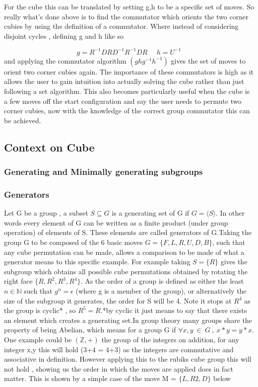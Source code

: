 \documentclass{article}
\begin{document}
For the cube this can be translated by setting g,h to be a specific set of moves. So really what's done above is to find the commutator which orients the two corner cubies by using the definition of a commutator. Where instead of considering disjoint cycles , defining g and h like so

\begin{equation}
	g = R^{-1}DRD^{-1}R^{-1}DR\ \ \ \ \ \ 
    h = U^{-1}
\end{equation}
and applying the commutator algorithm $(ghg^{-1}h^{-1})$ gives the set of moves to orient two corner cubies again. The importance of these commutators is high as it allows the user to gain intuition into actually solving the cube rather than just following a set algorithm. This also becomes particularly useful when the cube is a few moves off the start configuration and say the user needs to permute two corner cubies, now with the knowledge of the correct group commutator this can be achieved.



\subsection*{Context on Cube}
\subsubsection*{Generating and Minimally generating subgroups}


\subsubsection*{Generators}
Let G be a group , a subset $S\subseteq G$ is a generating set of G if $G =\langle S\rangle $. In other words every element of G can be written as a finite product (under group operation)  of elements of S. These elements are called generators of G.Taking the group G to be composed of the 6 basic moves  $G= \{{F,L,R,U,D,B}\}$, such that  any cube permutation can be made, allows  a comparison to be made of what a generator means to this specific example.  For example taking $S=\{R\}$ gives the subgroup which obtains all possible cube permutations obtained by rotating the right face $\{R,R^2,R^3,R^4\}$. As the order of a group is defined as either the least $n \in \mathbb{N}$ such that $g^n = \epsilon$ (where g is a member of the group),  or alternatively the size of the subgroup it generates, the order for S will be 4. Note it stops at $R^4$ as the group is cyclic* , so $R^5= R$.*by cyclic it just means to say that there exists an element which creates a generating set.\newline In group theory many groups share the property of being Abelian, which means for a group G if $\forall x,y\ \in\ G\ ,\ x*y=y*x$. One example could be $(\mathbb{Z},+)$ the group of the integers on addition, for any integer x,y this will hold (3+4 = 4+3) as the integers are commutative and associative in definition.
However applying this to the rubiks cube group this will not hold , showing us the order in which the moves are applied does in fact matter. This is shown by a simple case of the move M = $\{L,R2,D\}$ below
\end{document}
